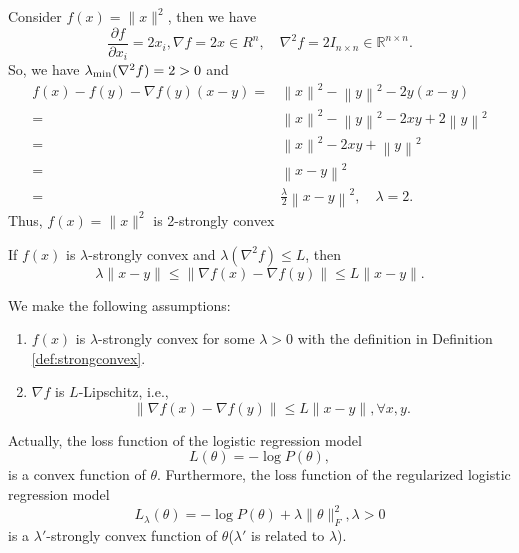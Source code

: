 \begin{example}
	Consider $f(x) = \|x\|^2$, then we have
	\begin{equation}\label{key}
	\frac{\partial f}{\partial x_{i}}=2x_{i}, \nabla f = 2x \in R^n,\quad \nabla^2f=2I_{n\times n}\in\mathbb{R}^{n\times n}.
	\end{equation}
	So, we have $\lambda_{\rm min}(\nabla^2f)=2>0$ and
	\begin{equation}
	\begin{aligned}
	f(x)-f(y)-\nabla f(y)(x-y)
	=&\left \| x \right \|^2-\left \| y \right \|^2-2y(x-y)\\
	=&\left \| x \right \|^2-\left \| y \right \|^2-2xy+2\left \| y \right \|^2\\
	=&\left \| x \right \|^2-2xy+\left \| y \right \|^2\\
	=&\left \| x-y \right \|^2\\
	=&\frac{\lambda }{2}\left \| x-y \right \|^2 , \quad \lambda=2.
	\end{aligned}
	\end{equation}	
	Thus, $f(x) = \|x\|^2$ is 2-strongly convex
\end{example}
\begin{lemma}
If $f(x)$ is $\lambda$-strongly convex and $\lambda(\nabla^2 f)\le L$, then
$$
\lambda\|x-y\|\le \|\nabla f(x) - \nabla f(y)\|\le L\|x-y\|.
$$
\end{lemma}
\begin{assumption}\label{ass:GD}
We make the following assumptions:
\begin{enumerate}
	\item $f(x)$ is $\lambda$-strongly convex for some $\lambda >0$ with the definition in Definition \ref{def:strongconvex}.  
	\item $\nabla f$ is $L$-Lipschitz, i.e., 
	\begin{equation}\label{key}
	\|\nabla f(x) - \nabla f(y)\| \le L\|x - y\|, \forall x,y.
	\end{equation}
\end{enumerate}	
\end{assumption}
\begin{example}
Actually, the loss function of the logistic regression model 
	\begin{equation}\label{key}
	L(\theta) = -\log P(\theta),
	\end{equation}
	is a convex  function of $\theta$. 
	Furthermore, the loss function of the regularized logistic regression model 
	\begin{equation}\label{key}
	L_\lambda(\theta) = -\log P(\theta) + \lambda \|\theta\|_F^2, \lambda > 0
	\end{equation}
	  is a $\lambda'$-strongly convex function of $\theta$($\lambda'$ is related to $\lambda$).
\end{example}


